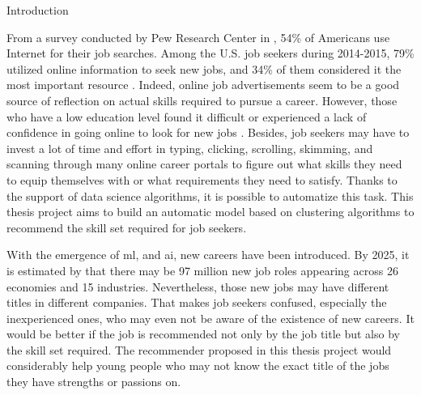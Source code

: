 \documentclass[a4paper,man,floatsintext,natbib,noextraspace]{apa6}
\makeatletter
\renewcommand{\section}{\@startsection {section}{1}
  {\z@}
  {\b@level@one@skip}
  {\e@level@one@skip}
  {\centering\normalfont\bfseries}}
\makeatother
\begin{document}
\newpage

\listoffigures

\newpage

\listoftables

\newpage

\printglossary[type=\acronymtype, title=List of Acronyms, toctitle=List of Acronyms]

\newpage


\setcounter{page}{1}

\section{Introduction}

From a survey conducted by Pew Research Center in \citeyear{smithSearchingWorkDigital2015}, 54\% of Americans use Internet for their job searches. Among the U.S. job seekers during 2014-2015, 79\% utilized online information to seek new jobs, and 34\% of them considered it the most important resource \citep{smithSearchingWorkDigital2015}. Indeed, online job advertisements seem to be a good source of reflection on actual skills required to pursue a career. However, those who have a low education level found it difficult or experienced a lack of confidence in going online to look for new jobs \citep{smithSearchingWorkDigital2015}. Besides, job seekers may have to invest a lot of time and effort in typing, clicking, scrolling, skimming, and scanning through many online career portals to figure out what skills they need to equip themselves with or what requirements they need to satisfy. Thanks to the support of data science algorithms, it is possible to automatize this task. This thesis project aims to build an automatic model based on clustering algorithms to recommend the skill set required for job seekers.

With the emergence of \gls{ml}, and \gls{ai}, new careers have been introduced. By 2025, it is estimated by \cite{worldeconomicforumFutureJobsReport2020} that there may be 97 million new job roles appearing across 26 economies and 15 industries. Nevertheless, those new jobs may have different titles in different companies. That makes job seekers confused, especially the inexperienced ones, who may even not be aware of the existence of new careers. It would be better if the job is recommended not only by the job title but also by the skill set required. The recommender proposed in this thesis project would considerably help young people who may not know the exact title of the jobs they have strengths or passions on. 
\end{document}
